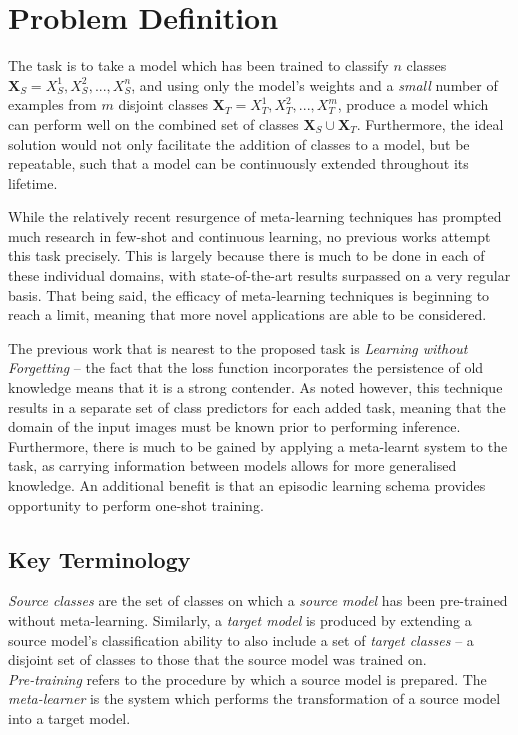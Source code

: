 \documentclass{report}
\begin{document}
\chapter{Problem Definition} \label{problem-definition}
The task is to take a model which has been trained to classify $n$ classes $\bm{X}_S = {X_S^1, X_S^2, ..., X_S^n}$, and using only the model's weights and a \emph{small} number of examples from $m$ disjoint classes $\bm{X}_T = {X_T^1, X_T^2, ..., X_T^m}$, produce a model which can perform well on the combined set of classes $\bm{X}_S \cup \bm{X}_T$.
Furthermore, the ideal solution would not only facilitate the addition of classes to a model, but be repeatable, such that a model can be continuously extended throughout its lifetime. \par
While the relatively recent resurgence of meta-learning techniques has prompted much research in few-shot and continuous learning, no previous works attempt this task precisely. This is largely because there is much to be done in each of these individual domains, with state-of-the-art results surpassed on a very regular basis. That being said, the efficacy of meta-learning techniques is beginning to reach a limit, meaning that more novel applications are able to be considered.	\par
The previous work that is nearest to the proposed task is \textit{Learning without Forgetting}\parencite{lwf} -- the fact that the loss function incorporates the persistence of old knowledge means that it is a strong contender. As noted however, this technique results in a separate set of class predictors for each added task, meaning that the domain of the input images must be known prior to performing inference. Furthermore, there is much to be gained by applying a meta-learnt system to the task, as carrying information between models allows for more generalised knowledge. An additional benefit is that an episodic learning schema provides opportunity to perform one-shot training. \par

\section{Key Terminology}
\textit{Source classes} are the set of classes on which a \textit{source model} has been pre-trained without meta-learning. Similarly, a \textit{target model} is produced by extending a source model's classification ability to also include a set of \textit{target classes} -- a disjoint set of classes to those that the source model was trained on. \\
\textit{Pre-training} refers to the procedure by which a source model is prepared. The \textit{meta-learner} is the system which performs the transformation of a source model into a target model.
\end{document}
